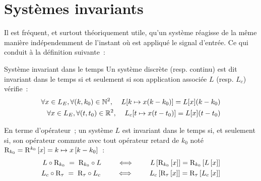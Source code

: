 	
\section{Systèmes invariants}
Il est fréquent, et surtout théoriquement utile, qu'un système
réagisse de la même manière indépendemment de l'instant où est
appliqué le signal d'entrée. Ce qui conduit à la définition suivante~:
\begin{definition}{Système invariant dans le temps}
  Un système discrète (resp. continu) est dit invariant dans le temps si et seulement
  si son application associée $L$ (resp. $L_c$) vérifie~:
  \begin{eqnarray}
    \forall x\in L_E, \forall (k,k_0)\in \mathbb{N}^2, \;\;\;\; L[k\mapsto x(k-k_{0})] = L[x](k-k_{0}) \\
    \forall x\in L_E, \forall (t,t_0)\in \mathbb{R}^2, \;\;\;\; L_c[t\mapsto x(t-t_{0})] = L[x](t-t_{0}) 
  \end{eqnarray}
  
  En terme d'opérateur~;  un système $L$ est invariant dans
  le temps si, et seulement si, son opérateur commute avec  tout opérateur
  retard de $k_0$ noté $\mathrm{R}_{k_0}=\mathrm{R}^{k_0}\left[x\right]= k\mapsto x\left[k-k_0\right]$~:
  \begin{eqnarray}
    \label{eq:sys_invariant}
    L\circ\mathrm{R}_{k_0} \; = \; \mathrm{R}_{k_0}\circ L  \qquad \iff \qquad  L\left[\mathrm{R}_{k_0}\left[x\right]\right] = \mathrm{R}_{k_0}\left[L\left[x\right]\right]
    \\
    L_c\circ\mathrm{R}_{\tau} \; = \; \mathrm{R}_{\tau}\circ L_c  \qquad \iff \qquad  L_c\left[\mathrm{R}_{\tau}\left[x\right]\right] = \mathrm{R}_{\tau}\left[L_c\left[x\right]\right]
  \end{eqnarray}
\end{definition}

